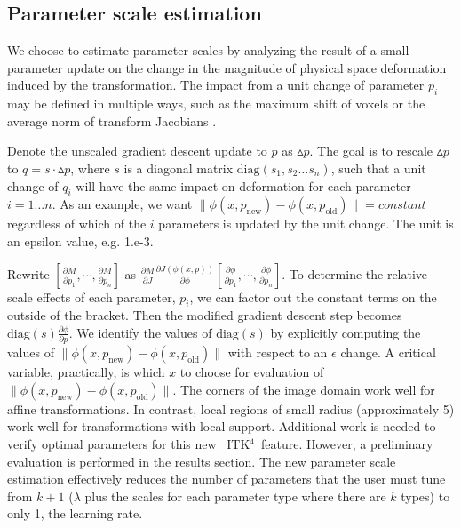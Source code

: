 \documentclass{frontiersSCNS}
\newcommand{\tk}{~ITK$^{\text{4}}$~}
\begin{document}
\subsection{Parameter scale estimation}
We choose to estimate parameter scales by analyzing the result of a
small parameter update on the change in the magnitude of physical space deformation
induced by the transformation.  The impact from a unit change of
parameter $p_i$ may be defined in multiple ways, such as the maximum shift of
voxels or the average norm of transform Jacobians \cite{Jenkinson2001}.

Denote the unscaled gradient descent update to $p$ as $\vartriangle
p$.  The goal is to rescale $\vartriangle p$ to $q = s \cdot \vartriangle p$, where $s$ is a diagonal
matrix $\text{diag} (s_1, s_2 \ldots s_n)$, such that a unit change of $q_i$ will have
the same impact on deformation for each parameter $i = 1... n$.   
As an example, we want $ \| \phi(x,p_{\text{new}}) -
\phi(x,p_\text{old}) \| = constant $ regardless of which of the
$i$ parameters is updated by the unit change.  The unit is an epsilon
value, e.g. 1.e-3.

Rewrite $[ \frac{\partial
  M}{\partial p_1} , \cdots , \frac{\partial
  M}{\partial p_n} 
 ]$ as $\frac{\partial M}{\partial J}\frac{\partial
  J(\phi(x,p))}{\partial \phi} [ \frac{\partial \phi}{\partial p_1} , \cdots , \frac{\partial \phi}{\partial p_n} ]$.
To determine the relative scale effects of each parameter, $p_i$, we
can factor out the constant terms on the outside of the bracket.  
Then the modified gradient descent step becomes
$\text{diag}(s)\frac{\partial \phi}{\partial p}$.  We identify the values
of $\text{diag}(s)$ by explicitly computing the values of $\| \phi(x,p_{\text{new}}) -
\phi(x,p_\text{old}) \| $ with respect to an $\epsilon$ change.  A critical variable,
practically, is which $x$ to choose for evaluation of $\| \phi(x,p_{\text{new}}) -
\phi(x,p_\text{old}) \| $.  The corners of the image domain work well
for affine transformations.  In contrast, local regions of small radius
(approximately 5) work well for transformations with local support.
Additional work is needed to verify optimal parameters for this new
\tk feature.  However, a preliminary evaluation is performed in the results
section.  The new parameter scale estimation effectively reduces the number of parameters
that the user must tune from $k+1$ ($\lambda$ plus the scales for each
parameter type where there are $k$ types) to only 1, the learning
rate.  
\end{document}
